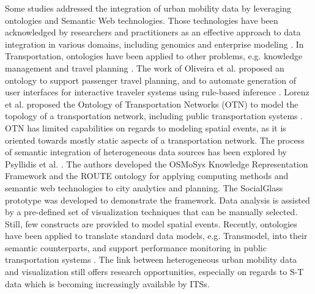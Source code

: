 \documentclass[]{interact}
\theoremstyle{plain}%
\theoremstyle{definition}
\theoremstyle{remark}
\theoremstyle{definition}
\begin{document}
Some studies addressed the integration of urban mobility data by leveraging ontologies and Semantic Web technologies. Those technologies have been acknowledged by researchers and practitioners as an effective approach to data integration in various domains, including genomics \citep{geneontology} and enterprise modeling \citep{DeGiacomo2018}. In Transportation, ontologies have been applied to other problems, e.g. knowledge management and travel planning \citep{Katsumi2018}. The work of Oliveira et al. proposed an ontology to support passenger travel planning, and to automate generation of user interfaces for interactive traveler systems using rule-based inference \citep{deOliveira2013}. Lorenz et al. proposed the Ontology of Transportation Networks (OTN) to model the topology of a transportation network, including public transportation systems \citep{Lorenz2005}. OTN has limited capabilities on regards to modeling spatial events, as it is oriented towards mostly static aspects of a transportation network. The process of semantic integration of heterogeneous data sources has been explored by Psyllidis et al. \citep{Psyllidis2016}. The authors developed the OSMoSys Knowledge Representation Framework and the ROUTE ontology for applying computing methods and semantic web technologies to city analytics and planning. The SocialGlass prototype was developed to demonstrate the framework. Data analysis is assisted by a pre-defined set of visualization techniques that can be manually selected. Still, few constructs are provided to model spatial events. Recently, ontologies have been applied to translate standard data models, e.g. Transmodel, into their semantic counterparts, and support performance monitoring in public transportation systems \citep{Benvenuti2017}. The link between heterogeneous urban mobility data and visualization still offers research opportunities, especially on regards to S-T data which is becoming increasingly available by ITSs.
\end{document}
